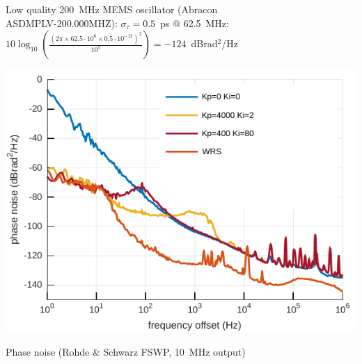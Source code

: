 \documentclass[compress,10pt,aspectratio=169]{beamer}
\begin{document}
\begin{frame}[fragile]
\begin{minipage}[t]{1.06\linewidth}
\begin{minipage}{.49\linewidth}
{{\footnotesize Low quality 200~MHz MEMS oscillator (Abracon \\ASDMPLV-200.000MHZ): $\sigma_\tau=0.5$~ps @ 62.5~MHz:\\
$10\log_{10}\left(\frac{(2\pi\times 62.5\cdot 10^6\times 0.5\cdot 10^{-12})^2}{10^5}\right)=-124$~dBrad$^2$/Hz\par
\par}
}
\end{minipage}
\begin{minipage}{.49\linewidth}
\includegraphics[width=\linewidth]{phase_noise_litex.pdf}

Phase noise (Rohde \& Schwarz FSWP, 10~MHz output)
\end{minipage}
\end{minipage}


\end{frame}
\end{document}
